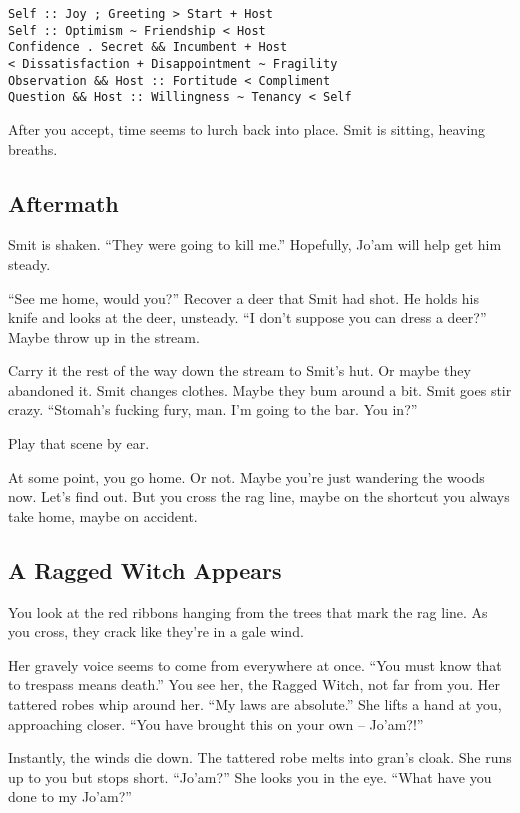 \begin{multicols}{2}
\begin{verbatim}
Self :: Joy ; Greeting > Start + Host
Self :: Optimism ~ Friendship < Host
Confidence . Secret && Incumbent + Host
< Dissatisfaction + Disappointment ~ Fragility
Observation && Host :: Fortitude < Compliment
Question && Host :: Willingness ~ Tenancy < Self
\end{verbatim}

After you accept, time seems to lurch back into place.
Smit is sitting, heaving breaths.

\subsection{Aftermath}
Smit is shaken.
``They were going to kill me.''
Hopefully, Jo'am will help get him steady.

``See me home, would you?''
Recover a deer that Smit had shot.
He holds his knife and looks at the deer, unsteady.
``I don't suppose you can dress a deer?''
Maybe throw up in the stream.

Carry it the rest of the way down the stream to Smit's hut.
Or maybe they abandoned it.
Smit changes clothes.
Maybe they bum around a bit.
Smit goes stir crazy.
``Stomah's fucking fury, man.
  I'm going to the bar.
  You in?''

Play that scene by ear.

At some point, you go home.
Or not.
Maybe you're just wandering the woods now.
Let's find out.
But you cross the rag line, maybe on the shortcut you always take home, maybe on accident.

\subsection{A Ragged Witch Appears}\label{subsec:scene:ARaggedWitchAppears}

  \begin{aloud}
  You look at the red ribbons hanging from the trees that mark the rag line.
  As you cross, they crack like they're in a gale wind.

  Her gravely voice seems to come from everywhere at once.
  ``You must know that to trespass means death.''
  You see her, the Ragged Witch, not far from you.
  Her tattered robes whip around her.
  ``My laws are absolute.''
  She lifts a hand at you, approaching closer.
  ``You have brought this on your own --
    Jo'am?!''

  Instantly, the winds die down.
  The tattered robe melts into gran's cloak.
  She runs up to you but stops short.
  ``Jo'am?''
  She looks you in the eye.
  ``What have you done to my Jo'am?''
  \end{aloud}


\end{multicols}
